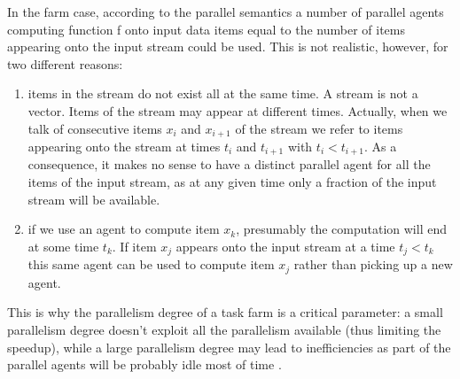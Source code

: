 In the farm case, according to the parallel semantics a number of parallel agents computing function f onto input data items equal to the number of items appearing onto the input stream could be used. This is not realistic, however, for two different reasons:

\begin{enumerate}
	\item items in the stream do not exist all at the same time. A stream is not a vector.
	Items of the stream may appear at different times. Actually, when we talk of consecutive items \(x_{i}\) and \(x_{i+1}\) of the stream we refer to items appearing onto the stream at times \(t_{i}\) and \(t_{i+1}\) with \(t_{i} < t_{i+1}\). As a consequence, it makes no sense to have a distinct parallel agent for all the items of the input stream, as at any given time only a fraction of the input stream will be available.
	
	\item  if we use an agent to compute item \(x_{k}\), presumably the computation will end at some
	time \(t_{k}\). If item \(x_{j}\) appears onto the input stream at a time \(t_{j} < t_{k}\) this same agent
	can be used to compute item \(x_{j}\) rather than picking up a new agent. \\
\end{enumerate}


This is why the parallelism degree of a task farm is a critical parameter: a small parallelism degree doesn't exploit all the parallelism available (thus limiting the speedup), while a large parallelism degree may lead to inefficiencies as part of the parallel agents will be probably idle most of time \cite{spm}.\\


